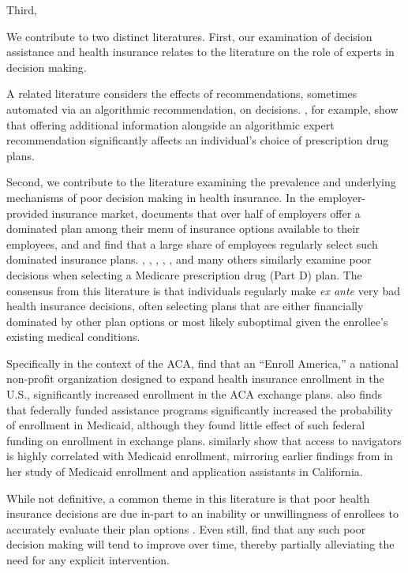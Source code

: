 \documentclass[12pt]{article}
\begin{document}
Third, 

We contribute to two distinct literatures. First, our examination of decision assistance and health insurance relates to the literature on the role of experts in decision making.

A related literature considers the effects of recommendations, sometimes automated via an algorithmic recommendation, on decisions. \cite{bundorf2019}, for example, show that offering additional information alongside an algorithmic expert recommendation significantly affects an individual's choice of prescription drug plans.

Second, we contribute to the literature examining the prevalence and underlying mechanisms of poor decision making in health insurance. In the employer-provided insurance market, \cite{liu2021} documents that over half of employers offer a dominated plan among their menu of insurance options available to their employees, and \cite{sinaiko2011} and \cite{bhargava2017} find that a large share of employees regularly select such dominated insurance plans. \cite{abaluck2011}, \cite{ketcham2012}, \cite{zhou2012}, \cite{heiss2013}, \cite{gruber2017}, \cite{ho2017rand} and many others similarly examine poor decisions when selecting a Medicare prescription drug (Part D) plan. The consensus from this literature is that individuals regularly make \textit{ex ante} very bad health insurance decisions, often selecting plans that are either financially dominated by other plan options or most likely suboptimal given the enrollee's existing medical conditions.

Specifically in the context of the ACA, \cite{orzol2018} find that an ``Enroll America,'' a national non-profit organization designed to expand health insurance enrollment in the U.S., significantly increased enrollment in the ACA exchange plans. \cite{myerson2019} also finds that federally funded assistance programs significantly increased the probability of enrollment in Medicaid, although they found little effect of such federal funding on enrollment in exchange plans. \cite{sommers2015} similarly show that access to navigators is highly correlated with Medicaid enrollment, mirroring earlier findings from \cite{aizer2003} in her study of Medicaid enrollment and application assistants in California.

\cite{aizawa2021}

While not definitive, a common theme in this literature is that poor health insurance decisions are due in-part to an inability or unwillingness of enrollees to accurately evaluate their plan options \citep{bhargava2017, hanoch2009}. Even still, \cite{ketcham2012} find that any such poor decision making will tend to improve over time, thereby partially alleviating the need for any explicit intervention. 
\end{document}
